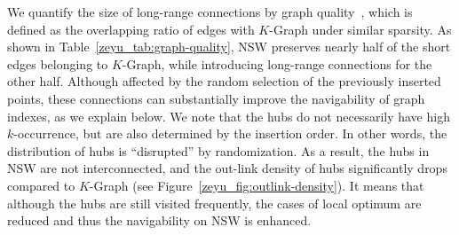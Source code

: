 \documentclass[11pt]{article}
\begin{document}
We quantify the size of long-range connections by graph quality~\cite{k-regular,wang-survey}, which is defined as the overlapping ratio of edges with $K$-Graph under similar sparsity.
As shown in Table~\ref{zeyu_tab:graph-quality}, NSW preserves nearly half of the short edges belonging to $K$-Graph, while introducing long-range connections for the other half.
Although affected by the random selection of the previously inserted points, these connections can substantially improve the navigability of graph indexes, as we explain below.
We note that the hubs do not necessarily have high $k$-occurrence, but are also determined by the insertion order.
In other words, the distribution of hubs is ``disrupted'' by randomization.
As a result, the hubs in NSW are not interconnected, and the out-link density of hubs significantly drops compared to $K$-Graph (see Figure~\ref{zeyu_fig:outlink-density}).
It means that although the hubs are still visited frequently, the cases of local optimum are reduced and thus the navigability on NSW is enhanced.

\end{document}
